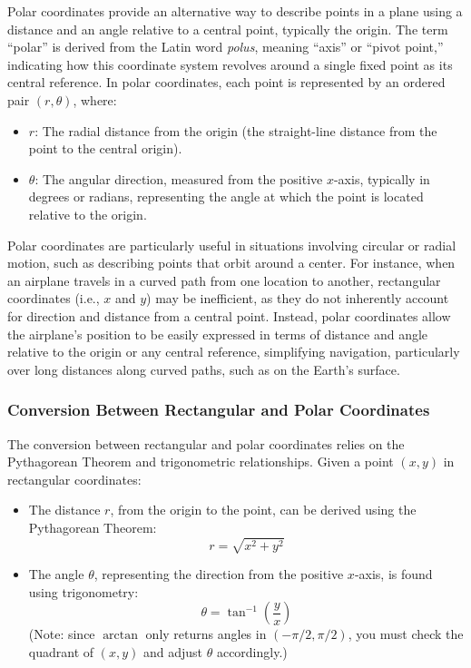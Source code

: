 Polar coordinates provide an alternative way to describe points in a plane using a distance and an angle relative to a central point, typically the origin. The term “polar” is derived from the Latin word \textit{polus}, meaning “axis” or “pivot point,” indicating how this coordinate system revolves around a single fixed point as its central reference. In polar coordinates, each point is represented by an ordered pair \( (r, \theta) \), where:
\begin{itemize}
    \item \( r \): The radial distance from the origin (the straight-line distance from the point to the central origin).
    \item \( \theta \): The angular direction, measured from the positive \( x \)-axis, typically in degrees or radians, representing the angle at which the point is located relative to the origin.
\end{itemize}

\noindent Polar coordinates are particularly useful in situations involving circular or radial motion, such as describing points that orbit around a center. For instance, when an airplane travels in a curved path from one location to another, rectangular coordinates (i.e., \( x \) and \( y \)) may be inefficient, as they do not inherently account for direction and distance from a central point. Instead, polar coordinates allow the airplane’s position to be easily expressed in terms of distance and angle relative to the origin or any central reference, simplifying navigation, particularly over long distances along curved paths, such as on the Earth's surface.

\subsubsection*{Conversion Between Rectangular and Polar Coordinates}

The conversion between rectangular and polar coordinates relies on the Pythagorean Theorem and trigonometric relationships. Given a point \( (x, y) \) in rectangular coordinates:
\begin{itemize}
    \item The distance \( r \), from the origin to the point, can be derived using the Pythagorean Theorem:
    \[
    r = \sqrt{x^2 + y^2}
    \]
    \item The angle \( \theta \), representing the direction from the positive \( x \)-axis, is found using trigonometry:
    \[
    \theta = \tan^{-1} \left( \frac{y}{x} \right)
    \]
    (Note: since \( \arctan \) only returns angles in \( (-\pi/2, \pi/2) \), you must check the quadrant of \( (x, y) \) and adjust \( \theta \) accordingly.)
\end{itemize}


